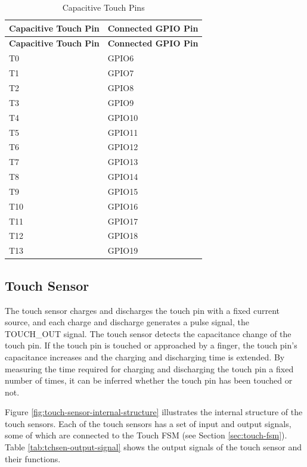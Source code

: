 \documentclass[main\_\_EN.tex]{subfiles}
\begin{document}
\begin{longtable}[c]{|p{4.0cm}|p{6.0cm}| }
    \caption{\chipname{} Capacitive Touch Pins}
    \label{tab:touch-pads}
    \\\hline
    \rowcolor{lightgray}
    \textbf{Capacitive Touch Pin} & \textbf{Connected GPIO Pin} \\ 
    \hline
    \endfirsthead
    \hline
    \rowcolor{lightgray}
    \textbf{Capacitive Touch Pin} & \textbf{Connected GPIO Pin} \\  
    \hline
    \endhead
    \endfoot
    \endlastfoot
    T0  &  GPIO6 \\\hline
    T1  &  GPIO7 \\\hline
    T2  &  GPIO8  \\\hline
    T3  &  GPIO9  \\\hline
    T4  &  GPIO10  \\\hline
    T5  &  GPIO11  \\\hline
    T6  &  GPIO12 \\\hline
    T7  &  GPIO13 \\\hline
    T8  &  GPIO14 \\\hline
    T9  &  GPIO15 \\\hline
    T10 &  GPIO16 \\\hline
    T11 &  GPIO17 \\\hline
    T12 &  GPIO18 \\\hline
    T13 &  GPIO19 \\\hline
\end{longtable}

\subsection{Touch Sensor}

The touch sensor charges and discharges the touch pin with a fixed current source, and each charge and discharge generates a pulse signal, the TOUCH\_OUT signal. The touch sensor detects the capacitance change of the touch pin. If the touch pin is touched or approached by a finger, the touch pin's capacitance increases and the charging and discharging time is extended. By measuring the time required for charging and discharging the touch pin a fixed number of times, it can be inferred whether the touch pin has been touched or not.

Figure \ref{fig:touch-sensor-internal-structure} illustrates the internal structure of the touch sensors. Each of the touch sensors has a set of input and output signals, some of which are connected to the Touch FSM (see Section \ref{sec:touch-fsm}). Table \ref{tab:tchsen-output-signal} shows the output signals of the touch sensor and their functions.
\end{document}
